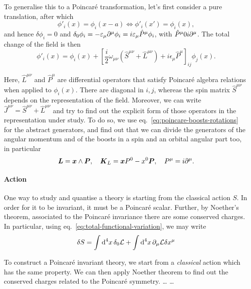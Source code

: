 To generalise this to a Poincaré transformation, let's first consider a pure translation, after which
\begin{equation}
    \phi'_i(x) = \phi_i (x-a) \iff \phi'_i(x') = \phi_i(x) ,
\end{equation}
and hence $\delta \phi_i = 0$ and $\delta_0 \phi_i = - \varepsilon_\mu \partial^\mu \phi_i = i \varepsilon_\mu \hat{P}^\mu \phi_i$, with $\hat{P}^\mu 0 i \partial^\mu$. The total change of the field is then
\begin{equation}
    \phi'_i(x) = \phi_i(x) + \left[ \frac{i}{2} \omega_{\mu\nu} ({\hat{S}}^{\mu\nu} + {\hat{L}}^{\mu\nu}) + i \epsilon_\mu \hat{P}^\mu \right]_{ij} \phi_j(x) .
\end{equation}

Here, $\hat{L}^{\mu\nu}$ and $\hat{P}^\mu$ are differential operators that satisfy Poincaré algebra relations when applied to $\phi_i(x)$. There are diagonal in $i,j$, whereas the spin matrix $\hat{S}^{\mu\nu}$ depends on the representation of the field. Moreover, we can write $\hat{J}^{\mu\nu} = \hat{S}^{\mu\nu} + \hat{L}^{\mu\nu}$ and try to find out the explicit form of those operators in the representation under study. To do so, we use eq.~\eqref{eq:poincare-boosts-rotations} for the abstract generators, and find out that we can divide the generators of the angular momentum and of the boosts in a spin and an orbital angular part too, in particular
\begin{equation}
    \boldsymbol{L} = \boldsymbol{x} \wedge \boldsymbol{P}, \quad \boldsymbol{K}_L = \boldsymbol{x} P^0 - x^0 \boldsymbol{P}, \quad P^\mu = i \partial^\mu .
\end{equation}


\paragraph{Action}
One way to study and quantise a theory is starting from the classical action $S$. In order for it to be invariant, it must be a Poincaré scalar. Further, by Noether's theorem, associated to the Poincaré invariance there are some conserved charges. In particular, using eq.~\eqref{eq:total-functional-variation}, we may write
\begin{equation}
    \delta S = \int {\mathop{}\!\mathrm{d}}^4 x \, \delta_0 \mathcal{L} + \int {\mathop{}\!\mathrm{d}}^4 x \, \partial_\mu \mathcal{L} \delta x^\mu
\end{equation}



To construct a Poincaré invariant theory, we start from a \emph{classical} action which has the same property. We can then apply Noether theorem to find out the conserved charges related to the Poincaré symmetry. 
\dots
\dots

